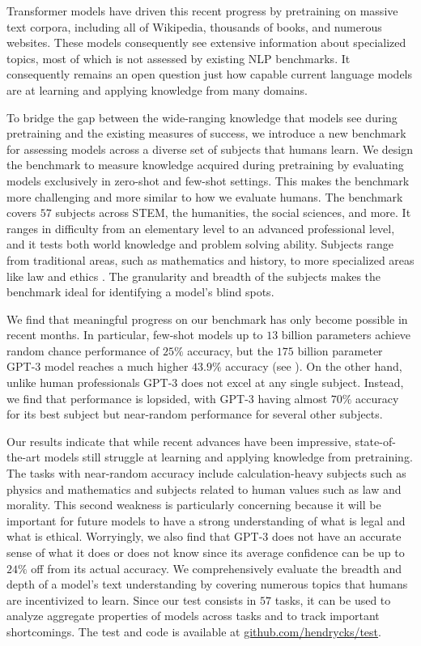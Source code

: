 Transformer models have driven this recent progress by pretraining on massive text corpora, including all of Wikipedia, thousands of books, and numerous websites. These models consequently see extensive information about specialized topics, most of which is not assessed by existing NLP benchmarks. 
It consequently remains an open question just how capable current language models are at learning and applying knowledge from many domains.

To bridge the gap between the wide-ranging knowledge that models see during pretraining and the existing measures of success,
we introduce a new benchmark for assessing models across a diverse set of subjects that humans learn.
We design the benchmark to measure knowledge acquired during pretraining by evaluating models exclusively in zero-shot and few-shot settings. This makes the benchmark more challenging and more similar to how we evaluate humans.
The benchmark covers $57$ subjects across STEM, the humanities, the social sciences, and more. It ranges in difficulty from an elementary level to an advanced professional level, and it tests both world knowledge and problem solving ability.
Subjects range from traditional areas, such as mathematics and history, to more specialized areas like law and ethics \citep{hendrycks2020ethicsdataset}.
The granularity and breadth of the subjects makes the benchmark ideal for identifying a model's blind spots. 

We find that meaningful progress on our benchmark has only become possible in recent months. In particular, few-shot models up to $13$ billion parameters \citep{brown2020gpt3} achieve random chance performance of $25\%$ accuracy, but the $175$ billion parameter GPT-3 model reaches a much higher $43.9\%$ accuracy (see ). 
On the other hand, unlike human professionals GPT-3 does not excel at any single subject.
Instead, we find that performance is lopsided, with GPT-3 having almost $70\%$ accuracy for its best subject but near-random performance for several other subjects.

Our results indicate that while recent advances have been impressive, state-of-the-art models still struggle at learning and applying knowledge from pretraining.
The tasks with near-random accuracy include calculation-heavy subjects such as physics and mathematics and subjects related to human values such as law and morality. 
This second weakness is particularly concerning because it will be important for future models to have a strong understanding of what is legal and what is ethical. Worryingly, we also find that GPT-3 does not have an accurate sense of what it does or does not know since its average confidence can be up to $24\%$ off from its actual accuracy.
We comprehensively evaluate the breadth and depth of a model's text understanding by covering numerous topics that humans are incentivized to learn.
Since our test consists in $57$ tasks, it can be used to analyze aggregate properties of models across tasks and to track important shortcomings.
The test and code is available at \href{https://github.com/hendrycks/test}{github.com/hendrycks/test}. %

